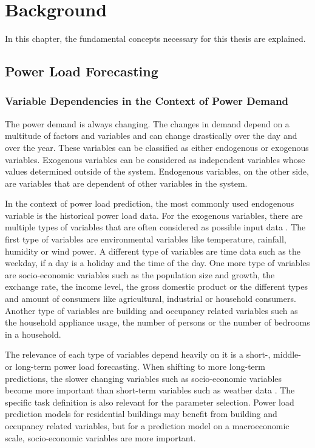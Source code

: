 \chapter{Background}
\label{background}

In this chapter, the fundamental concepts necessary for this thesis are explained.

\section{Power Load Forecasting}

\subsection{Variable Dependencies in the Context of Power Demand}

The power demand is always changing. The changes in demand depend on a multitude 
of factors and variables and can change drastically over the day and over the year.
These variables can be classified as either endogenous or exogenous variables.
Exogenous variables can be considered as independent variables 
whose values determined outside of the system. 
Endogenous variables, on the other side, 
are variables that are dependent of other variables in the 
system.

In the context of power load prediction, the most commonly 
used endogenous variable is the historical power load data.
For the exogenous variables, there are multiple types of 
variables that are often considered as possible input data \cite{exogenousdata}
\cite{exogenousdata2}.
The first type of variables are environmental variables like temperature, 
rainfall, humidity or wind power. A different type of variables are time data
such as the weekday, if a day is a holiday and the time of the day.
One more type of variables are socio-economic variables such as the
population size and growth, the exchange rate, the income level,
the gross domestic product or the different types and amount 
of consumers like agricultural, industrial or household consumers.
Another type of variables are building and occupancy related variables such
as the household appliance usage,
the number of persons or the number of bedrooms in a household.

The relevance of each type of variables depend heavily on it is
a short-, middle- or long-term power load forecasting. When shifting to more 
long-term predictions, the slower changing variables such as socio-economic
variables become more important than short-term variables such as weather data 
\cite{loadforecastingtimedependency2}\cite{loadforecastingtimedependency}.
The specific task definition is also relevant for the parameter selection.
Power load prediction models for residential buildings may benefit from 
building and occupancy related variables, but for a prediction model on a 
macroeconomic scale, socio-economic variables are more important.

